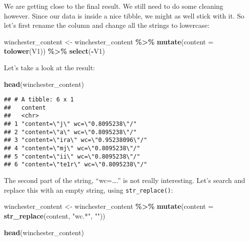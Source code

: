 \documentclass[
]{article}
\newenvironment{Shaded}{\begin{snugshade}}{\end{snugshade}}
\newcommand{\DataTypeTok}[1]{\textcolor[rgb]{0.13,0.29,0.53}{#1}}
\newcommand{\KeywordTok}[1]{\textcolor[rgb]{0.13,0.29,0.53}{\textbf{#1}}}
\newcommand{\NormalTok}[1]{#1}
\newcommand{\OperatorTok}[1]{\textcolor[rgb]{0.81,0.36,0.00}{\textbf{#1}}}
\newcommand{\StringTok}[1]{\textcolor[rgb]{0.31,0.60,0.02}{#1}}
\begin{document}
We are getting close to the final result. We still need to do some cleaning however. Since our data
is inside a nice tibble, we might as well stick with it. So let's first rename the column and
change all the strings to lowercase:

\begin{Shaded}
\begin{Highlighting}[]
\NormalTok{winchester\_content \textless{}{-}}\StringTok{ }\NormalTok{winchester\_content }\OperatorTok{\%\textgreater{}\%}\StringTok{ }
\StringTok{  }\KeywordTok{mutate}\NormalTok{(}\DataTypeTok{content =} \KeywordTok{tolower}\NormalTok{(V1)) }\OperatorTok{\%\textgreater{}\%}\StringTok{ }
\StringTok{  }\KeywordTok{select}\NormalTok{(}\OperatorTok{{-}}\NormalTok{V1)}
\end{Highlighting}
\end{Shaded}

Let's take a look at the result:

\begin{Shaded}
\begin{Highlighting}[]
\KeywordTok{head}\NormalTok{(winchester\_content)}
\end{Highlighting}
\end{Shaded}

\begin{verbatim}
## # A tibble: 6 x 1
##   content                             
##   <chr>                               
## 1 "content=\"j\" wc=\"0.8095238\"/"   
## 2 "content=\"a\" wc=\"0.8095238\"/"   
## 3 "content=\"ira\" wc=\"0.95238096\"/"
## 4 "content=\"mj\" wc=\"0.8095238\"/"  
## 5 "content=\"ii\" wc=\"0.8095238\"/"  
## 6 "content=\"te1r\" wc=\"0.8095238\"/"
\end{verbatim}

The second part of the string, ``wc=\ldots.'' is not really interesting. Let's search and replace this
with an empty string, using \texttt{str\_replace()}:

\begin{Shaded}
\begin{Highlighting}[]
\NormalTok{winchester\_content \textless{}{-}}\StringTok{ }\NormalTok{winchester\_content }\OperatorTok{\%\textgreater{}\%}\StringTok{ }
\StringTok{  }\KeywordTok{mutate}\NormalTok{(}\DataTypeTok{content =} \KeywordTok{str\_replace}\NormalTok{(content, }\StringTok{"wc.*"}\NormalTok{, }\StringTok{""}\NormalTok{))}

\KeywordTok{head}\NormalTok{(winchester\_content)}
\end{Highlighting}
\end{Shaded}
\end{document}
